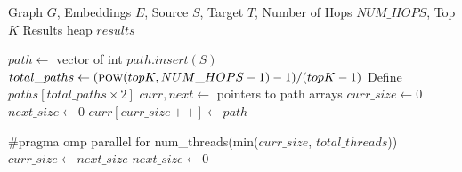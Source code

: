 \documentclass[sigconf]{acmart}
\begin{document}
\begin{algorithm}
\caption{Generic Multi-Hop Reasoning Algorithm}
\begin{algorithmic}[1]
\scriptsize
\Require Graph $G$, Embeddings $E$, Source $S$, Target $T$, Number of Hops $NUM\_HOPS$, Top $K$
\Ensure Results heap $results$

    \State $path \gets$ vector of int
    \State $path.insert(S)$ 
    \State $total\_paths \gets (\Call{pow}{topK, NUM\_HOPS - 1} - 1) / (topK - 1)$
    \State Define $paths[total\_paths \times 2]$ 
    \State $curr, next \gets$ pointers to path arrays
    \State $curr\_size \gets 0$
    \State $next\_size \gets 0$
    \State $curr[curr\_size++] \gets path$ 
    
        \State \#pragma omp parallel for num\_threads(min($curr\_size$, $total\_threads$))
            \State {}
        \EndFor
        \State {}
        \State $curr\_size \gets next\_size$
        \State $next\_size \gets 0$
    \EndFor
\EndFunction
\end{algorithmic}
\label{algo:MultihopReasoningGeneric}
\end{algorithm}
\end{document}
